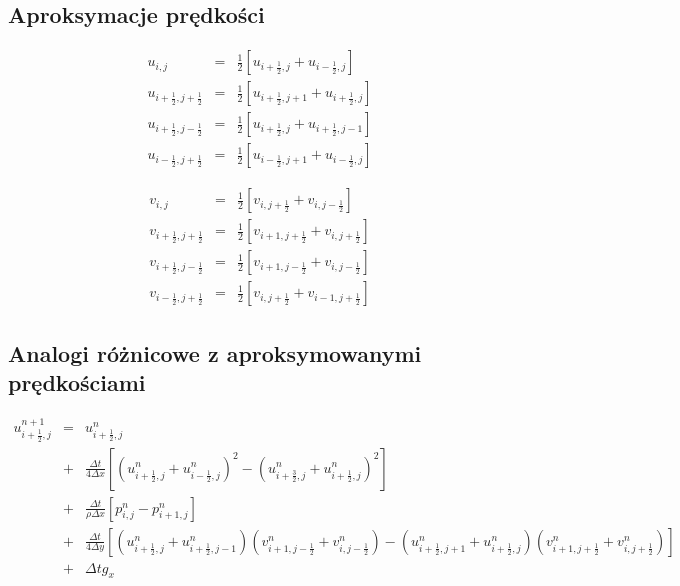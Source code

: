 \documentclass[a4paper,10pt]{article}
\begin{document}
  \subsection{Aproksymacje prędkości}

	\begin{eqnarray}
		u_{i,j} & = & \frac{1}{2} \left [ u_{i+\frac{1}{2}, j} + u_{i - \frac{1}{2},j} \right ] \\
		u_{i+\frac{1}{2},j+\frac{1}{2}} & = & \frac{1}{2} \left [ u_{i+\frac{1}{2}, j+1} + u_{i + \frac{1}{2},j} \right ] \\
		u_{i+\frac{1}{2},j-\frac{1}{2}} & = & \frac{1}{2} \left [ u_{i+\frac{1}{2}, j} + u_{i + \frac{1}{2},j-1} \right ] \\
		u_{i-\frac{1}{2},j+\frac{1}{2}} & = & \frac{1}{2} \left [ u_{i-\frac{1}{2}, j+1} + u_{i-\frac{1}{2},j} \right ] 
	\end{eqnarray}

	\begin{eqnarray}
		v_{i,j} & = & \frac{1}{2} \left [ v_{i, j+\frac{1}{2}} + v_{i,j-\frac{1}{2}} \right ] \\
		v_{i+\frac{1}{2},j+\frac{1}{2}} & = & \frac{1}{2} \left [ v_{i+1, j+\frac{1}{2}} + v_{i,j+\frac{1}{2}} \right ] \\
		v_{i+\frac{1}{2},j-\frac{1}{2}} & = & \frac{1}{2} \left [ v_{i+1, j-\frac{1}{2}} + v_{i,j-\frac{1}{2}} \right ] \\
		v_{i-\frac{1}{2},j+\frac{1}{2}} & = & \frac{1}{2} \left [ v_{i, j+\frac{1}{2}} + v_{i-1,j+\frac{1}{2}} \right ] 
	\end{eqnarray}

  \subsection{Analogi różnicowe z aproksymowanymi prędkościami}


	\begin{eqnarray}
		u^{n+1}_{i+\frac{1}{2},j} & = & u^{n}_{i+\frac{1}{2},j} \\
			\nonumber & + & \frac{\Delta t}{4 \Delta x} \left [ \left ( u^n_{i+\frac{1}{2}, j} + u^n_{i - \frac{1}{2},j} \right )^2 - \left ( u^n_{i+\frac{3}{2}, j} + u^n_{i + \frac{1}{2},j} \right )^2 \right ] \\
			\nonumber & + & \frac{\Delta t}{\rho \Delta x} \left [ p^{n}_{i,j} - p^{n}_{i+1,j}  \right ] \\
			\nonumber & + & \frac{\Delta t}{4 \Delta y} \left [ \left ( u^n_{i+\frac{1}{2}, j} + u^n_{i + \frac{1}{2},j-1} \right ) \left ( v^n_{i+1, j-\frac{1}{2}} + v^n_{i,j-\frac{1}{2}} \right ) - \left ( u^n_{i+\frac{1}{2}, j+1} + u^n_{i + \frac{1}{2},j} \right ) \left ( v^n_{i+1, j+\frac{1}{2}} + v^n_{i,j+\frac{1}{2}} \right ) \right ] \\
			\nonumber & + & \Delta t g_x
	\end{eqnarray}
\end{document}
